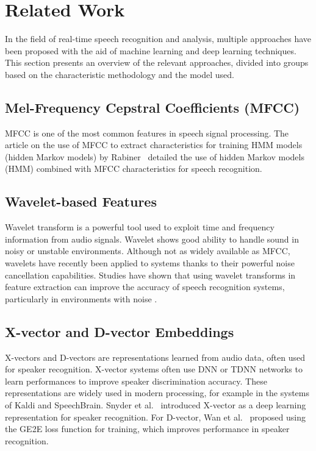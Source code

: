 \documentclass[conference]{IEEEtran}
\begin{document}
\section{Related Work}

In the field of real-time speech recognition and analysis, multiple approaches have been proposed with the aid of machine learning and deep learning techniques. This section presents an overview of the relevant approaches, divided into groups based on the characteristic methodology and the model used.

\subsection{Mel-Frequency Cepstral Coefficients (MFCC)}

MFCC is one of the most common features in speech signal processing. The article on the use of MFCC to extract characteristics for training HMM models (hidden Markov models) by Rabiner~\cite{rabiner1989tutorial} detailed the use of hidden Markov models (HMM) combined with MFCC characteristics for speech recognition.
\subsection{Wavelet-based Features}

Wavelet transform is a powerful tool used to exploit time and frequency information from audio signals. Wavelet shows good ability to handle sound in noisy or unstable environments. Although not as widely available as MFCC, wavelets have recently been applied to systems thanks to their powerful noise cancellation capabilities. Studies have shown that using wavelet transforms in feature extraction can improve the accuracy of speech recognition systems, particularly in environments with noise \cite{gupta2003robust, wang2008robust}.

\subsection{X-vector and D-vector Embeddings}

X-vectors and D-vectors are representations learned from audio data, often used for speaker recognition. X-vector systems often use DNN or TDNN networks to learn performances to improve speaker discrimination accuracy. These representations are widely used in modern processing, for example in the systems of Kaldi and SpeechBrain. Snyder et al.~\cite{Snyder2018Xvectors} introduced X-vector as a deep learning representation for speaker recognition. For D-vector, Wan et al.~\cite{Wan2018Generalized} proposed using the GE2E loss function for training, which improves performance in speaker recognition.
\end{document}
